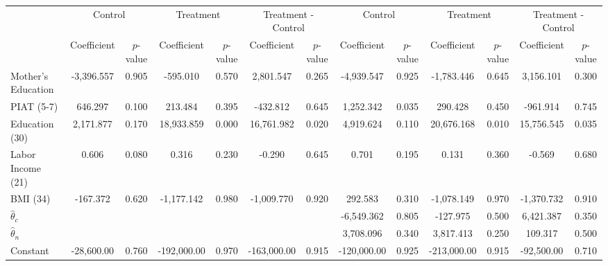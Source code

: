 \begin{tabular}{lcccccccccccc} \toprule
&\multicolumn{2}{c}{Control} & \multicolumn{2}{c}{Treatment} & \multicolumn{2}{c}{Treatment - Control} & \multicolumn{2}{c}{Control} & \multicolumn{2}{c}{Treatment} & \multicolumn{2}{c}{Treatment - Control} \\
 & Coefficient  & $p$-value  & Coefficient  & $p$-value & Coefficient  & $p$-value  & Coefficient  & $p$-value  & Coefficient  & $p$-value  & Coefficient  & $p$-value \\ \midrule
Mother's Education & -3,396.557 &     0.905 &  -595.010 &     0.570 &  2,801.547 &     0.265 & -4,939.547 &     0.925 & -1,783.446 &     0.645 &  3,156.101 &     0.300 \\  
PIAT (5-7)&   646.297 &     0.100 &   213.484 &     0.395 &  -432.812 &     0.645 &  1,252.342 &     0.035 &   290.428 &     0.450 &  -961.914 &     0.745 \\  
Education (30) &  2,171.877 &     0.170 & 18,933.859 &     0.000 & 16,761.982 &     0.020 &  4,919.624 &     0.110 & 20,676.168 &     0.010 & 15,756.545 &     0.035 \\  
Labor Income (21) &     0.606 &     0.080 &     0.316 &     0.230 &    -0.290 &     0.645 &     0.701 &     0.195 &     0.131 &     0.360 &    -0.569 &     0.680 \\  
BMI (34)  &  -167.372 &     0.620 & -1,177.142 &     0.980 & -1,009.770 &     0.920 &   292.583 &     0.310 & -1,078.149 &     0.970 & -1,370.732 &     0.910 \\  
$\hat{\theta}_{c}$ &         &        &        &        &        &        &-6,549.362 &     0.805 &  -127.975 &     0.500 &  6,421.387 &     0.350 \\  
$\hat{\theta}_{n}$ &         &        &        &        &        &        & 3,708.096 &     0.340 &  3,817.413 &     0.250 &   109.317 &     0.500 \\  
Constant & -28,600.00 &     0.760 & -192,000.00 &     0.970 & -163,000.00 &     0.915 & -120,000.00 &     0.925 & -213,000.00 &     0.915 & -92,500.00 &     0.710 \\  
\bottomrule \end{tabular}
